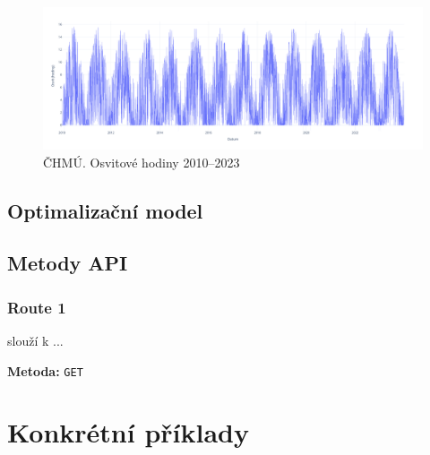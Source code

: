 

\begin{figure}[H]
    \includegraphics[width=\textwidth]{static/graphs/osvit.png}
    \caption{ČHMÚ. Osvitové hodiny 2010--2023}
    \label{fig:ote}
\end{figure}

\subsection{Optimalizační model}


\subsection{Metody API}

\subsubsection{Route 1} slouží k ...

\textbf{Metoda:} \texttt{GET}



\section{Konkrétní příklady}